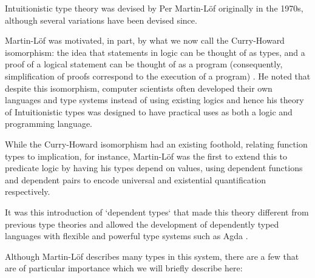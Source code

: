           Intuitionistic type theory was devised by Per Martin-Löf
          \cite{martinlof1980} originally in the 1970s, although
          several variations have been devised since.

          Martin-Löf was motivated, in part, by what we now call the
          Curry-Howard isomorphism: the idea that statements in logic can be
          thought of as types, and a proof of a logical statement can
          be thought of as a program (consequently, simplification of
          proofs correspond to the execution of a program)
          \cite{wadler2015}. He noted that despite this isomorphism,
          computer scientists often developed their own
          languages and type systems instead of using existing
          logics and hence his theory of Intuitionistic types was
          designed to have practical uses as both a logic and
          programming language.

          While the Curry-Howard isomorphism had an existing
          foothold, relating function types to implication, for
          instance, Martin-Löf was the first to extend this to
          predicate logic by having his types depend on values,
          using dependent functions and dependent pairs to encode
          universal and existential quantification respectively.

          It was this introduction of `dependent types` that made this
          theory different from previous type theories and allowed
          the development of dependently typed languages with flexible
          and powerful type systems such as Agda \cite{norell}.

          Although Martin-Löf describes many types in this system,
          there are a few that are of particular importance which we will
          briefly describe here: 

